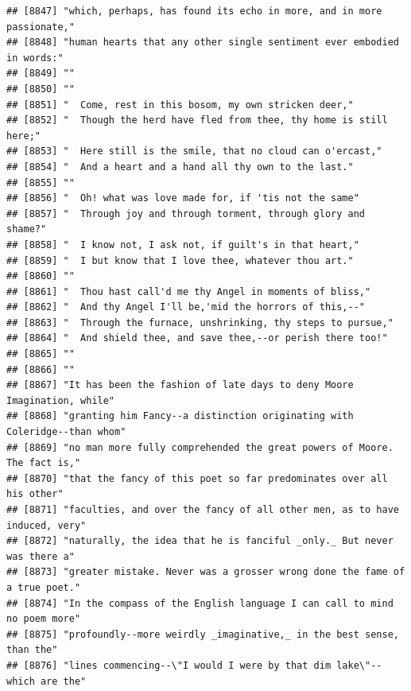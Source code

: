 \documentclass{article}\usepackage[]{graphicx}\usepackage[]{color}
\makeatletter
\newenvironment{kframe}{%
 \def\at@end@of@kframe{}%
 \ifinner\ifhmode%
  \def\at@end@of@kframe{\end{minipage}}%
  \begin{minipage}{\columnwidth}%
 \fi\fi%
 \def\FrameCommand##1{\hskip\@totalleftmargin \hskip-\fboxsep
 \colorbox{shadecolor}{##1}\hskip-\fboxsep
     \hskip-\linewidth \hskip-\@totalleftmargin \hskip\columnwidth}%
 \MakeFramed {\advance\hsize-\width
   \@totalleftmargin\z@ \linewidth\hsize
   \@setminipage}}%
 {\par\unskip\endMakeFramed%
 \at@end@of@kframe}
\newenvironment{knitrout}{}{} %
\makeatother
\begin{document}
\begin{knitrout}
\begin{kframe}
\begin{verbatim}
## [8847] "which, perhaps, has found its echo in more, and in more passionate,"         
## [8848] "human hearts that any other single sentiment ever embodied in words:"        
## [8849] ""                                                                            
## [8850] ""                                                                            
## [8851] "  Come, rest in this bosom, my own stricken deer,"                           
## [8852] "  Though the herd have fled from thee, thy home is still here;"              
## [8853] "  Here still is the smile, that no cloud can o'ercast,"                      
## [8854] "  And a heart and a hand all thy own to the last."                           
## [8855] ""                                                                            
## [8856] "  Oh! what was love made for, if 'tis not the same"                          
## [8857] "  Through joy and through torment, through glory and shame?"                 
## [8858] "  I know not, I ask not, if guilt's in that heart,"                          
## [8859] "  I but know that I love thee, whatever thou art."                           
## [8860] ""                                                                            
## [8861] "  Thou hast call'd me thy Angel in moments of bliss,"                        
## [8862] "  And thy Angel I'll be,'mid the horrors of this,--"                         
## [8863] "  Through the furnace, unshrinking, thy steps to pursue,"                    
## [8864] "  And shield thee, and save thee,--or perish there too!"                     
## [8865] ""                                                                            
## [8866] ""                                                                            
## [8867] "It has been the fashion of late days to deny Moore Imagination, while"       
## [8868] "granting him Fancy--a distinction originating with Coleridge--than whom"     
## [8869] "no man more fully comprehended the great powers of Moore. The fact is,"      
## [8870] "that the fancy of this poet so far predominates over all his other"          
## [8871] "faculties, and over the fancy of all other men, as to have induced, very"    
## [8872] "naturally, the idea that he is fanciful _only._ But never was there a"       
## [8873] "greater mistake. Never was a grosser wrong done the fame of a true poet."    
## [8874] "In the compass of the English language I can call to mind no poem more"      
## [8875] "profoundly--more weirdly _imaginative,_ in the best sense, than the"         
## [8876] "lines commencing--\"I would I were by that dim lake\"--which are the"        

\end{verbatim}
\end{kframe}
\end{knitrout}
\end{document}
